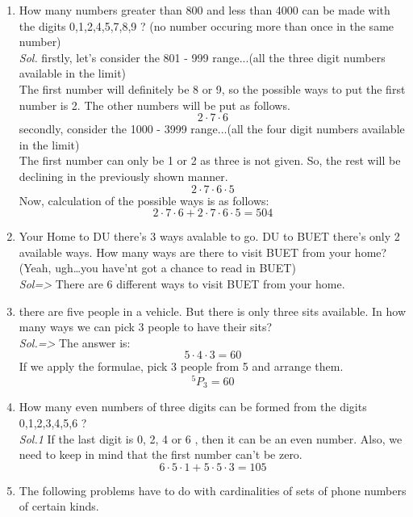 \documentclass{book}
\begin{document}
\begin{enumerate}
\begin{itemize}
	      \end{itemize}
	\item How many numbers greater than 800 and less than 4000 can be made with the digits 0,1,2,4,5,7,8,9 ? (no number occuring more than once in the same number)\\
	      \textit{ Sol. }
	      firstly, let's consider the 801 - 999 range...(all the three digit numbers available in the limit)\\
	      The first number will definitely be 8 or 9, so the possible ways to put the first number is 2. The other numbers will be put as follows.
	      \[
		      2 \cdot 7 \cdot 6
	      \]
	      secondly, consider the 1000 - 3999 range...(all the four digit numbers available in the limit)\\
	      The first number can only be 1 or 2 as three  is not given. So, the rest will be declining in the previously shown manner.
	      \[
		      2 \cdot 7\cdot 6\cdot 5
	      \]
	      Now, calculation of the possible ways is as follows:
	      \[
		      2 \cdot 7 \cdot 6 + 2 \cdot 7\cdot 6\cdot 5 = 504
	      \]
	\item Your Home to DU there's 3 ways avalable to go. DU to BUET there's only 2 available ways. How many ways are there to visit BUET from your home?\\
	      (Yeah, ugh\dots you have'nt got a chance to read in BUET)\\
	      \textit{ Sol=> } There are 6 different ways to visit BUET from your home.
	\item there are five people in a vehicle. But there is only three sits available. In how many ways we can pick 3 people to have their sits?\\
	      \textit{ Sol.=> } The answer is:
	      \[
		      5 \cdot 4 \cdot 3 = 60
	      \]
	      If we apply the formulae,
	      pick 3 people from 5 and arrange them.
	      \[
		      ^5P_3 = 60
	      \]
	\item How many even numbers of three digits can be formed from the digits 0,1,2,3,4,5,6 ?\\
	      \textit{ Sol.1} If the last digit is 0, 2, 4 or 6 , then it can be an even number. Also, we need to keep in mind that
	      the first number can't be zero.
	      \[
		      6 \cdot 5 \cdot 1 + 5 \cdot 5 \cdot 3 = 105
	      \]
	\item  The following problems have to do with cardinalities of sets
	      of phone numbers of certain kinds.
	      \begin{itemize}

\end{itemize}
\end{enumerate}
\end{document}
